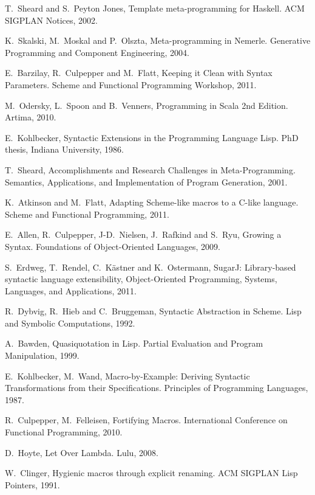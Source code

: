 \documentclass[10pt,journal,a4paper]{IEEEtran}
\begin{document}
\begin{thebibliography}{99}

T.~Sheard and S.~Peyton Jones,
Template meta-programming for Haskell.
ACM SIGPLAN Notices, 2002.

K.~Skalski, M.~Moskal and P.~Olszta,
Meta-programming in Nemerle.
Generative Programming and Component Engineering, 2004.

E.~Barzilay, R.~Culpepper and M.~Flatt,
Keeping it Clean with Syntax Parameters.
Scheme and Functional Programming Workshop, 2011.

M.~Odersky, L.~Spoon and B.~Venners,
Programming in Scala 2nd Edition.
Artima, 2010.

E.~Kohlbecker,
Syntactic Extensions in the Programming Language Lisp.
PhD thesis, Indiana University, 1986.

T.~Sheard,
Accomplishments and Research Challenges in Meta-Programming.
Semantics, Applications, and Implementation of Program Generation, 2001.

K.~Atkinson and M.~Flatt,
Adapting Scheme-like macros to a C-like language.
Scheme and Functional Programming, 2011.

E.~Allen, R.~Culpepper, J-D.~Nielsen, J.~Rafkind and S.~Ryu,
Growing a Syntax.
Foundations of Object-Oriented Languages, 2009.

S.~Erdweg, T.~Rendel, C.~K\"{a}stner and K.~Ostermann,
SugarJ: Library-based syntactic language extensibility,
Object-Oriented Programming, Systems, Languages, and Applications, 2011.

R.~Dybvig, R.~Hieb and  C.~Bruggeman,
Syntactic Abstraction in Scheme.
Lisp and Symbolic Computations, 1992.

A.~Bawden,
Quasiquotation in Lisp.
Partial Evaluation and Program Manipulation, 1999.

E.~Kohlbecker, M.~Wand,
Macro-by-Example: Deriving Syntactic Transformations from their Specifications.
Principles of Programming Languages, 1987.

R.~Culpepper, M.~Felleisen,
Fortifying Macros.
International Conference on Functional Programming, 2010.

D.~Hoyte,
Let Over Lambda.
Lulu, 2008.

W.~Clinger,
Hygienic macros through explicit renaming.
ACM SIGPLAN Lisp Pointers, 1991.


\end{thebibliography}
\end{document}
